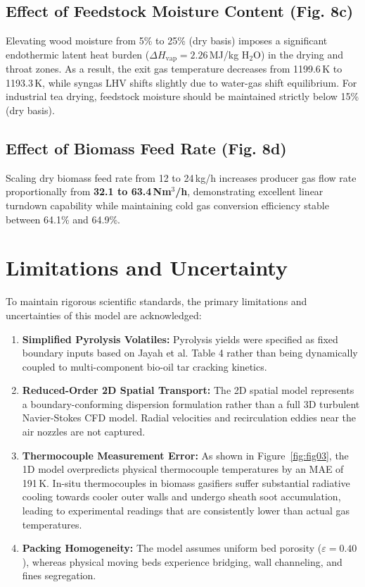 \documentclass[11pt,a4paper]{article}
\begin{document}
\subsection{Effect of Feedstock Moisture Content (Fig. 8c)}
Elevating wood moisture from 5\% to 25\% (dry basis) imposes a significant endothermic latent heat burden ($\Delta H_{\text{vap}} = 2.26$\,MJ/kg H$_2$O) in the drying and throat zones. As a result, the exit gas temperature decreases from 1199.6\,K to 1193.3\,K, while syngas LHV shifts slightly due to water-gas shift equilibrium. For industrial tea drying, feedstock moisture should be maintained strictly below 15\% (dry basis).

\subsection{Effect of Biomass Feed Rate (Fig. 8d)}
Scaling dry biomass feed rate from 12 to 24\,kg/h increases producer gas flow rate proportionally from \textbf{32.1 to 63.4\,Nm$^3$/h}, demonstrating excellent linear turndown capability while maintaining cold gas conversion efficiency stable between 64.1\% and 64.9\%.

\section{Limitations and Uncertainty}
To maintain rigorous scientific standards, the primary limitations and uncertainties of this model are acknowledged:
\begin{enumerate}[leftmargin=1.5em]
    \item \textbf{Simplified Pyrolysis Volatiles:} Pyrolysis yields were specified as fixed boundary inputs based on Jayah et al. Table 4 rather than being dynamically coupled to multi-component bio-oil tar cracking kinetics.
    \item \textbf{Reduced-Order 2D Spatial Transport:} The 2D spatial model represents a boundary-conforming dispersion formulation rather than a full 3D turbulent Navier-Stokes CFD model. Radial velocities and recirculation eddies near the air nozzles are not captured.
    \item \textbf{Thermocouple Measurement Error:} As shown in Figure~\ref{fig:fig03}, the 1D model overpredicts physical thermocouple temperatures by an MAE of 191\,K. In-situ thermocouples in biomass gasifiers suffer substantial radiative cooling towards cooler outer walls and undergo sheath soot accumulation, leading to experimental readings that are consistently lower than actual gas temperatures.
    \item \textbf{Packing Homogeneity:} The model assumes uniform bed porosity ($\varepsilon = 0.40$), whereas physical moving beds experience bridging, wall channeling, and fines segregation.
\end{enumerate}
\end{document}

